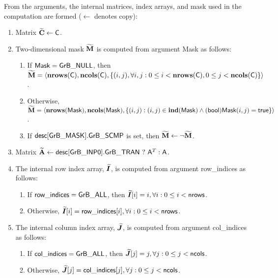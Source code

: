 From the arguments, the internal matrices, index arrays, and mask used in 
the computation are formed ($\leftarrow$ denotes copy):
\begin{enumerate}
	\item Matrix ${\bf \widetilde{C}} \leftarrow {\sf C}$.

	\item Two-dimensional mask ${\bf \widetilde{M}}$ is computed from 
    argument {\sf Mask} as follows:
	\begin{enumerate}

		\item	If ${\sf Mask} = {\sf GrB\_NULL}$, then ${\bf \widetilde{M}} = 
        \langle \bold{nrows}({\sf C}), \bold{ncols}({\sf C}), \{(i,j), 
        \forall i,j : 0 \leq i <  \bold{nrows}({\sf C}), 0 \leq j < 
        \bold{ncols}({\sf C}) \} \rangle$.

		\item	Otherwise, ${\bf \widetilde{M}} = \langle 
        \bold{nrows}({\sf Mask}), \bold{ncols}({\sf Mask}), \{(i,j) : 
        (i,j) \in \bold{ind}({\sf Mask}) \wedge 
        ({\sf bool}){\sf Mask}(i,j) = {\sf true}\} \rangle$.

		\item	If ${\sf desc[GrB\_MASK].GrB\_SCMP}$ is set, then 
        ${\bf \widetilde{M}} \leftarrow \neg {\bf \widetilde{M}}$.
	\end{enumerate}

	\item Matrix ${\bf \widetilde{A}} \leftarrow 
    {\sf desc[GrB\_INP0].GrB\_TRAN} \ ? \ {\sf A}^T : {\sf A}$.

    \item The internal row index array, $\bm{\widetilde{I}}$, is computed from 
    argument {\sf row\_indices} as follows:
	\begin{enumerate}
		\item	If ${\sf row\_indices} = {\sf GrB\_ALL}$, then 
        $\bm{\widetilde{I}}[i] = i, \forall i : 0 \leq i < {\sf nrows}$.

		\item	Otherwise, $\bm{\widetilde{I}}[i] = {\sf row\_indices}[i], 
        \forall i : 0 \leq i < {\sf nrows}$.
    \end{enumerate}
    
    \item The internal column index array, $\bm{\widetilde{J}}$, is computed from 
    argument {\sf col\_indices} as follows:
	\begin{enumerate}
		\item	If ${\sf col\_indices} = {\sf GrB\_ALL}$, then 
        $\bm{\widetilde{J}}[j] = j, \forall j : 0 \leq j < {\sf ncols}$.

		\item	Otherwise, $\bm{\widetilde{J}}[j] = {\sf col\_indices}[j], 
        \forall j : 0 \leq j < {\sf ncols}$.
    \end{enumerate}
\end{enumerate}

